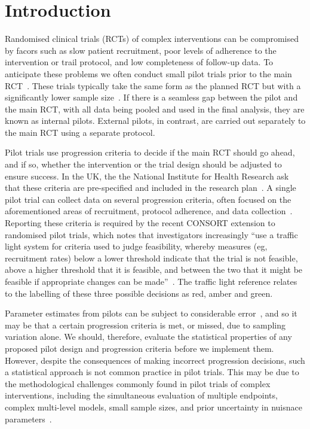 \documentclass{article} %
\begin{document}
\section{Introduction}\label{sec:introduction}

Randomised clinical trials (RCTs) of complex interventions can be compromised by facors such as slow patient recruitment, poor levels of adherence to the intervention or trail protocol, and low completeness of follow-up data. To anticipate these problems we often conduct small pilot trials prior to the main RCT~\cite{Craig2008}. These trials typically take the same form as the planned RCT but with a significantly lower sample size~\cite{Eldridge2016}. If there is a seamless gap between the pilot and the main RCT, with all data being pooled and used in the final analysis, they are known as internal pilots. External pilots, in contrast, are carried out separately to the main RCT using a separate protocol.

Pilot trials use progression criteria to decide if the main RCT should go ahead, and if so, whether the intervention or the trial design should be adjusted to ensure success. In the UK, the the National Institute for Health Research ask that these criteria are pre-specified and included in the research plan~\cite{NIHR2017}. A single pilot trial can collect data on several progression criteria, often focused on the aforementioned areas of recruitment, protocol adherence, and data collection~\cite{Avery2017}. Reporting these criteria is required by the recent CONSORT extension to randomised pilot trials, which notes that investigators increasingly ``use a traffic light system for criteria used to judge feasibility, whereby measures (eg, recruitment rates) below a lower threshold indicate that the trial is not feasible, above a higher threshold that it is feasible, and between the two that it might be feasible if appropriate changes can be made''~\cite{Eldridge2016a}. The traffic light reference relates to the labelling of these three possible decisions as red, amber and green. %

Parameter estimates from pilots can be subject to considerable error~\cite{Eldridge2016a}, and so it may be that a certain progression criteria is met, or missed, due to sampling variation alone. We should, therefore, evaluate the statistical properties of any proposed pilot design and progression criteria before we implement them. However, despite the consequences of making incorrect progression decisions, such a statistical approach is not common practice in pilot trials. This may be due to the methodological challenges commonly found in  pilot trials of complex interventions, including the simultaneous evaluation of multiple endpoints, complex multi-level models, small sample sizes, and prior uncertainty in nuisnace parameters~\cite{Wilson2015}.
\end{document}
